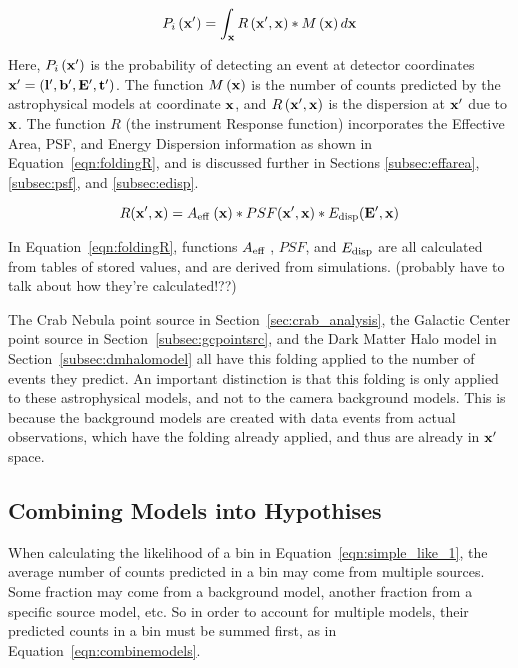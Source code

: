   \begin{equation}\label{eqn:folding}
    P_i \left( \mathbf{x'} \right ) = \int_{\mathbf{x }} R \left ( \mathbf{x'}, \mathbf{x } \right ) * M \left ( \mathbf{x } \right ) d\mathbf{x }
  \end{equation}
  
  Here, $P_i \left( \mathbf{x'} \right )$ is the probability of detecting an event at detector coordinates $\mathbf{x'} = \left ( \mathbf{l'}, \mathbf{b'}, \mathbf{E'}, \mathbf{t'} \right )$.
  The function $M\left ( \mathbf{x } \right )$ is the number of counts predicted by the astrophysical models at coordinate $\mathbf{x }$, and $R \left ( \mathbf{x'}, \mathbf{x } \right )$ is the dispersion at $\mathbf{x'}$ due to $\mathbf{x }$.
  The function $R$ (the instrument Response function) incorporates the Effective Area, PSF, and Energy Dispersion information as shown in Equation~\ref{eqn:foldingR}, and is discussed further in Sections \ref{subsec:effarea}, \ref{subsec:psf}, and \ref{subsec:edisp}.
  
  \begin{equation}\label{eqn:foldingR}
    R(\mathbf{x'},\mathbf{x }) = A_\textrm{eff }(\mathbf{x }) * PSF(\mathbf{x'},\mathbf{x }) * E_\textrm{disp}(\mathbf{E'},\mathbf{x })
  \end{equation}
  
  In Equation~\ref{eqn:foldingR}, functions $A_\textrm{eff }$, $PSF$, and $E_\textrm{disp}$ are all calculated from tables of stored values, and are derived from simulations.
  {\color{red}(probably have to talk about how they're calculated!??)}

  The Crab Nebula point source in Section~\ref{sec:crab_analysis}, the Galactic Center point source in Section~\ref{subsec:gcpointsrc}, and the Dark Matter Halo model in Section~\ref{subsec:dmhalomodel} all have this folding applied to the number of events they predict.
  An important distinction is that this folding is only applied to these astrophysical models, and not to the camera background models.
  This is because the background models are created with data events from actual observations, which have the folding already applied, and thus are already in $\mathbf{x'}$ space.
  
  \subsection{Combining Models into Hypothises}
  
  When calculating the likelihood of a bin in Equation~\ref{eqn:simple_like_1}, the average number of counts predicted in a bin may come from multiple sources.
  Some fraction may come from a background model, another fraction from a specific source model, etc.
  So in order to account for multiple models, their predicted counts in a bin must be summed first, as in Equation~\ref{eqn:combinemodels}.
  
